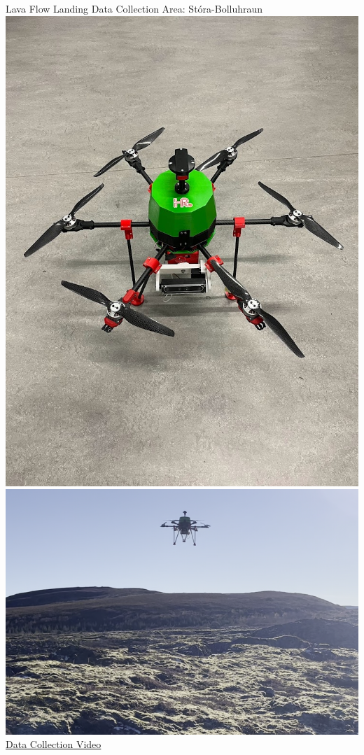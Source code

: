 \documentclass[aspectratio=169]{beamer}
\begin{document}
\begin{frame}{Lava Flow Landing Data Collection Area: Stóra-Bolluhraun}
	\centering
	\includegraphics[height=0.8\textheight]{./images/depth_drone_sitting}
	\includegraphics[height=0.8\textheight]{./images/depth_drone_flying}
	\\
	\href{run:./scratch_idea_for_processing_depth_data.mp4}{Data Collection Video}
\end{frame}
\end{document}
